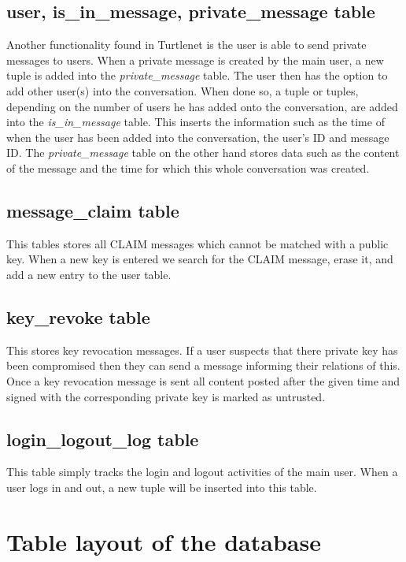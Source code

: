 \subsection{user, is\_in\_message, private\_message table}
Another functionality found in Turtlenet is the user is able to send private 
messages to users. When a private message is created by the main user, a new 
tuple is added into the {\it private\_message} table. The user then has the 
option to add other user(s) into the conversation. When done so, a tuple or 
tuples, depending on the number of users he has added onto the conversation, are 
added into the {\it is\_in\_message} table. This inserts the information such as 
the time of when the user has been added into the conversation, the user's ID 
and message ID. The {\it private\_message} table on the other hand stores data 
such as the content of the message and the time for which this whole conversation 
was created. 

\subsection{message\_claim table}
This tables stores all CLAIM messages which cannot be matched with a public key.
When a new key is entered we search for the CLAIM message, erase it, and add a
new entry to the user table.

\subsection{key\_revoke table}
This stores key revocation messages. If a user suspects that there private key
has been compromised then they can send a message informing their relations of
this. Once a key revocation message is sent all content posted after the given
time and signed with the corresponding private key is marked as untrusted.

\subsection{login\_logout\_log table}
This table simply tracks the login and logout activities of the main user. When a 
user logs in and out, a new tuple will be inserted into this table.

\clearpage

\section{Table layout of the database}

